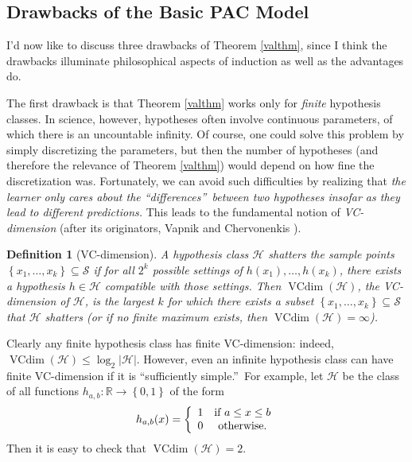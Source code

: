 \documentclass[12pt,onecolumn]{article}%
\newtheorem{definition}[theorem]{Definition}
\begin{document}
\subsection{Drawbacks of the Basic PAC Model\label{DRAWBACKS}}

I'd now like to discuss three drawbacks of Theorem \ref{valthm}, since I think
the drawbacks illuminate philosophical aspects of induction as well as the
advantages do.

The first drawback is that Theorem \ref{valthm} works only for \textit{finite}
hypothesis classes. In science, however, hypotheses often involve continuous
parameters, of which there is an uncountable infinity. Of course, one could
solve this problem by simply discretizing the parameters, but then the number
of hypotheses (and therefore the relevance of Theorem \ref{valthm}) would
depend on how fine the discretization was. Fortunately, we can avoid such
difficulties by realizing that \textit{the learner only cares about the
\textquotedblleft differences\textquotedblright\  between two hypotheses
insofar as they lead to different predictions.} This leads to the
fundamental notion of \textit{VC-dimension} (after its originators, Vapnik and
Chervonenkis \cite{vc}).

\begin{definition}
[VC-dimension]A hypothesis class $\mathcal{H}$ shatters the sample points
$\left\{  x_{1},\ldots,x_{k}\right\}  \subseteq\mathcal{S}$ if for all
$2^{k}$ possible settings of $h(  x_{1})  ,\ldots,h(
x_{k})  $, there exists a hypothesis $h\in\mathcal{H}$ compatible with
those settings. Then $\operatorname*{VCdim}\left(  \mathcal{H}\right)  $,
the VC-dimension of $\mathcal{H}$, is the largest $k$ for which there exists a
subset $\left\{  x_{1},\ldots,x_{k}\right\}  \subseteq\mathcal{S}$ that
$\mathcal{H}$ shatters (or if no finite maximum exists, then
$\operatorname*{VCdim}\left(  \mathcal{H}\right)  =\infty$).
\end{definition}

Clearly any finite hypothesis class has finite VC-dimension: indeed,
$\operatorname*{VCdim}\left(  \mathcal{H}\right)  \leq\log_{2}\left\vert
\mathcal{H}\right\vert $. However, even an infinite hypothesis class can
have finite VC-dimension if it is \textquotedblleft sufficiently
simple.\textquotedblright\  For example, let $\mathcal{H}$ be the class of
all functions $h_{a,b}:\mathbb{R}\rightarrow\left\{  0,1\right\}  $ of the
form%
\[
h_{a,b}(  x)  =\left\{
\begin{array}
[c]{cc}%
1 & \text{if }a\leq x\leq b\\
0 & \text{otherwise.}%
\end{array}
\right.
\]
Then it is easy to check that $\operatorname*{VCdim}\left(  \mathcal{H}%
\right)  =2$.
\end{document}
